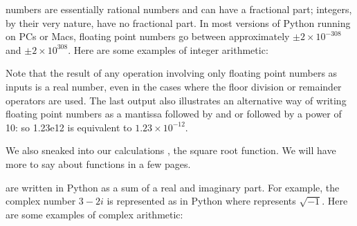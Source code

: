 \documentclass[letterpaper,10pt,english]{sphinxmanual}
\begin{document}
\sphinxAtStartPar
{} numbers are essentially rational numbers and can have a fractional part; integers, by their very nature, have no fractional part.  In most versions of Python running on PCs or Macs, floating point numbers go between approximately \(\pm 2 \times 10^{-308}\) and \(\pm 2 \times 10^{308}\).    Here are some examples of integer arithmetic:

\begin{sphinxVerbatim}[commandchars=\\\{\},numbers=left,firstnumber=1,stepnumber=1]





\end{sphinxVerbatim}

\sphinxAtStartPar
Note that the result of any operation involving only floating point numbers as inputs is a real number, even in the cases where the floor division \sphinxcode{\sphinxupquote{//}} or remainder \sphinxcode{\sphinxupquote{\%}} operators are used.  The last output also illustrates an alternative way of writing floating point numbers as a mantissa followed by and  or  followed by a power of 10: so 1.23e\sphinxhyphen{}12 is equivalent to  \(1.23 \times 10^{-12}\).

\sphinxAtStartPar
We also sneaked into our calculations , the square root function.  We will have more to say about functions in a few pages.

\sphinxAtStartPar
{} are written in Python as a sum of a real and imaginary part.  For example, the complex number \(3-2i\) is represented as  in Python where  represents \(\sqrt{-1}\).  Here are some examples of complex arithmetic:
\end{document}
